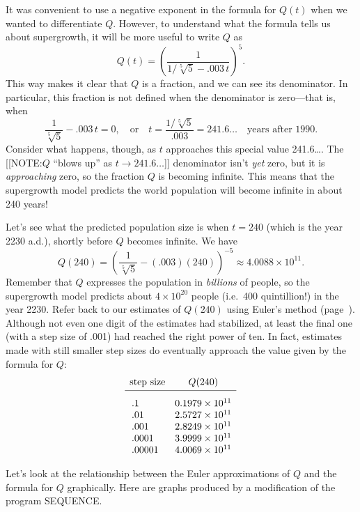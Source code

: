 	It was convenient to use a negative exponent in the formula for $Q(t)$ when we wanted to differentiate $Q$.  However, to understand what the formula tells us about supergrowth, it will be more useful to write $Q$ as
	\[
Q(t)= \left( \frac{1}{1/\sqrt[5]{5}-.003\,t} \right)^5
		\!\!.
\]
This way makes it clear that $Q$ is a fraction, and we can see its denominator.  In particular, this fraction is not defined when the denominator is zero---that is, when 
	\[
\frac{1}{\sqrt[5]{5}} - .003\,t = 0, \quad \mbox{or}
		\quad t = \frac{1/\sqrt[5]{5}}{.003} 
		= 241.6\ldots \quad  \mbox{years after 1990}.
\]
Consider what happens, though, as $t$ approaches this special value 241.6\ldots .  The 
	[[NOTE:$Q$ ``blows up'' as $t \to 241.6\ldots$]]
denominator isn't {\em yet\/} zero, but it is {\em approaching\/} zero, so the fraction $Q$ is becoming infinite.   This means that the supergrowth model predicts the world population will become infinite in about 240 years!

	Let's see what the predicted population size is when $t = 240$ (which is the year 2230 {\sc a.d.}), shortly before $Q$ becomes infinite.  We have 
	\[
Q(240) = \left( \frac{1}{\sqrt[5]{5}} - (.003)(240)
		\right)^{-5} \approx 4.0088 \times 10^{11}.
\]
Remember that $Q$ expresses the population in {\em billions\/} of people, so the supergrowth model predicts about $4 \times 10^{20}$ people (i.e.\  400 quintillion!) in the year 2230.    Refer back to our estimates of $Q(240)$ using Euler's method (page~\pageref{Q(240)}). Although not even one digit of the estimates had stabilized, at least the final one (with a step size of .001) had reached the right power of ten.  In fact, estimates made with still smaller step sizes do eventually approach the value given by the formula for $Q$:
	\addtolength{\arraycolsep}{3pt}
	\[
\begin{array}{cc}
	\mbox{step size} & Q(240) \\ [2pt] \hline
	\rule{0pt}{16pt}  .1\hphantom{00000} \rule{0pt}{16pt} 
		& 0.1979 \times 10^{11}  \\
	.01\hphantom{0000} & 2.5727 \times 10^{11} \\
	.001\hphantom{000} & 2.8249 \times 10^{11} \\
	.0001\hphantom{00} & 3.9999 \times 10^{11} \\
	.00001\hphantom{0} & 4.0069 \times 10^{11} 
	\end{array}
\]
	\addtolength{\arraycolsep}{-3pt}

	Let's look at the relationship between the Euler approximations of $Q$ and the formula for $Q$ graphically.  Here are graphs produced by a modification of the program SEQUENCE.

